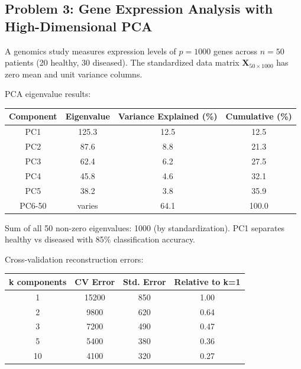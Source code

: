 \documentclass[12pt]{article}
\begin{document}
\subsection*{Problem 3: Gene Expression Analysis with High-Dimensional PCA}

A genomics study measures expression levels of $p=1000$ genes across $n=50$ patients (20 healthy, 30 diseased). The standardized data matrix $\mathbf{X}_{50 \times 1000}$ has zero mean and unit variance columns.

PCA eigenvalue results:
\begin{center}
\begin{tabular}{cccc}
\toprule
Component & Eigenvalue & Variance Explained (\%) & Cumulative (\%) \\
\midrule
PC1 & 125.3 & 12.5 & 12.5 \\
PC2 & 87.6 & 8.8 & 21.3 \\
PC3 & 62.4 & 6.2 & 27.5 \\
PC4 & 45.8 & 4.6 & 32.1 \\
PC5 & 38.2 & 3.8 & 35.9 \\
PC6-50 & varies & 64.1 & 100.0 \\
\bottomrule
\end{tabular}
\end{center}

Sum of all 50 non-zero eigenvalues: 1000 (by standardization). PC1 separates healthy vs diseased with 85\% classification accuracy.

Cross-validation reconstruction errors:
\begin{center}
\begin{tabular}{cccc}
\toprule
k components & CV Error & Std. Error & Relative to k=1 \\
\midrule
1 & 15200 & 850 & 1.00 \\
2 & 9800 & 620 & 0.64 \\
3 & 7200 & 490 & 0.47 \\
5 & 5400 & 380 & 0.36 \\
10 & 4100 & 320 & 0.27 \\
\bottomrule
\end{tabular}
\end{center}
\end{document}
